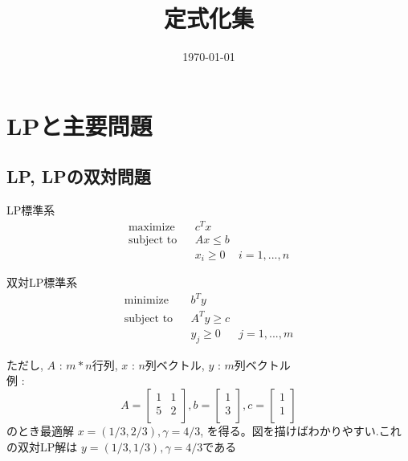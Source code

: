 \documentclass[13pt, a4paper, landscape]{jarticle}
\title{定式化集}
\date {\today}
\theoremstyle{nonitalic} %
\begin{document}
\maketitle

\section{LPと主要問題}
\subsection {LP, LPの双対問題}

LP標準系
\begin{align}
 &&&&&\textrm{maximize}   && c^Tx \\
 &&&&&\textrm{subject to} && Ax \leq b  &&&&&\\
 &&&&&                    && x_i \geq 0 & i = 1,...,n &&&&&
\end{align}

双対LP標準系
\begin{align}
 &&&&&\textrm{minimize}   && b^Ty \\
 &&&&&\textrm{subject to} && A^T y \geq c  &&&&&\\
 &&&&&                    && y_j \geq 0 & j = 1,...,m &&&&&
\end{align}

ただし, 
$A$ : $m*n$行列, 
$x$ : $n$列ベクトル, 
$y$ : $m$列ベクトル \\

例 : 
\begin{equation*}
 A = 
 \left[\begin{array}{cc}
  1 & 1 \\
  5 & 2 \\
 \end{array}\right],
 b = 
 \left[\begin{array}{c}
     1 \\
     3 \\
   \end{array}\right],
 c = 
 \left[\begin{array}{c}
     1 \\
     1 \\
 \end{array}\right]
\end{equation*}
のとき最適解 $x = (1/3, 2/3) , \gamma = 4/3  $, を得る。図を描けばわかりやすい.これの双対LP解は
$y = (1/3, 1/3), \gamma = 4/3$である
\end{document}
